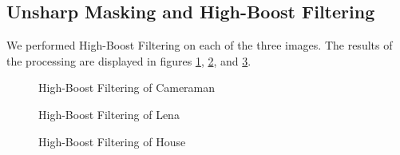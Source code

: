 \documentclass[journal]{IEEEtran}
\begin{document}
\subsection{Unsharp Masking and High-Boost Filtering}
We performed High-Boost Filtering on each of the three images. The results of the processing are displayed in figures \ref{boostFilterCameraman}, \ref{boostFilterLena}, and \ref{boostFilterHouse}.

\begin{figure}[!h]
\centering
{}
\caption{High-Boost Filtering of Cameraman}
\label{boostFilterCameraman}
\end{figure}

\begin{figure}[!h]
\centering
{}
\caption{High-Boost Filtering of Lena}
\label{boostFilterLena}
\end{figure}

\begin{figure}[!h]
\centering
{}
\caption{High-Boost Filtering of House}
\label{boostFilterHouse}
\end{figure}
\end{document}
